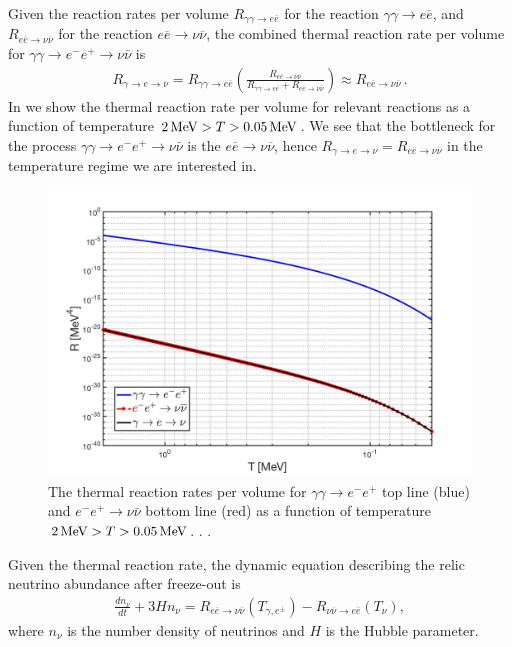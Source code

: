  Given the reaction rates per volume $R_{\gamma\gamma\to e\overline{e}}$ for the reaction $\gamma\gamma\to e\overline{e}$, and $R_{e\overline{e}\to\nu\overline{\nu}}$ for the reaction $e\overline{e}\to\nu\overline{\nu}$, the combined thermal reaction rate per volume for $\gamma\gamma\to e^-e^+\to\nu\bar{\nu}$ is
\begin{align}
R_{\gamma\to e\to\nu}=R_{\gamma\gamma\to e\overline{e}}\left(\frac{R_{e\overline{e}\to\nu\overline{\nu}}}{R_{\gamma\gamma\to e\overline{e}}+R_{e\overline{e}\to\nu\overline{\nu}}}\right)\approx R_{e\overline{e}\to\nu\overline{\nu}}\,.
\end{align}
In  we show the thermal reaction rate per volume for relevant reactions as a function of temperature $2\text{\,MeV}>T>0.05\text{\,MeV}$. We see that the bottleneck for the process $\gamma\gamma\to e^-e^+\to\nu\bar{\nu}$ is the $e\overline{e}\to\nu\overline{\nu}$, hence $R_{\gamma\to e\to\nu}=R_{e\overline{e}\to\nu\overline{\nu}}$ in the temperature regime we are interested in.
\begin{figure}
\begin{center}
\includegraphics[width=0.9\linewidth]{./plots/Extra_neutrino_rate_volume}
\caption{The thermal reaction rates per volume for $\gamma\gamma\to e^-e^+$ top line (blue) and $e^-e^+\to\nu\bar{\nu}$ bottom line (red) as a function of temperature $2\text{\,MeV}>T>0.05\text{\,MeV}$. . .}
\label{ExtraNeutrinoRate}
\end{center}
\end{figure}

Given the thermal reaction rate, the dynamic equation describing the relic neutrino abundance after freeze-out is
\begin{align}\label{ExtraNeutrioEq}
\frac{dn_\nu}{dt}+3Hn_\nu=R_{e\overline{e}\to\nu\overline{\nu}}(T_{\gamma,e^\pm})-R_{\nu\overline{\nu}\to e\overline{e}}(T_\nu),
\end{align}
where $n_\nu$ is the number density of neutrinos and $H$ is the Hubble parameter. 

